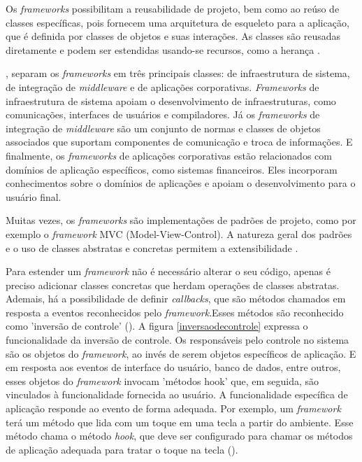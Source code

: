 Os \textit{frameworks} possibilitam a reusabilidade de projeto, bem como ao reúso de classes específicas, pois fornecem uma arquitetura de esqueleto para a aplicação, que é definida por classes de objetos e suas interações. As classes são reusadas diretamente e podem ser estendidas usando-se recursos, como a herança \cite{sommerville:2013}. 

\cite{fayad:1997}, separam os \textit{frameworks} em três principais classes: de infraestrutura de sistema, de integração de \textit{middleware} e de aplicações corporativas. \textit{Frameworks} de infraestrutura de sistema apoiam o desenvolvimento de infraestruturas, como comunicações, interfaces de usuários e compiladores. Já os \textit{frameworks} de integração de \textit{middleware} são um conjunto de normas e classes de objetos associados que suportam componentes de comunicação e troca de informações. E finalmente, os \textit{frameworks} de aplicações corporativas estão relacionados com domínios de aplicação específicos, como sistemas financeiros. Eles incorporam conhecimentos sobre o domínios de aplicações e apoiam o desenvolvimento para o usuário final.

Muitas vezes, os \textit{frameworks} são implementações de padrões de projeto, como por exemplo o \textit{framework} MVC (Model-View-Control). A natureza geral dos padrões e o uso de classes abstratas e concretas permitem a extensibilidade \cite{sommerville:2013}.

Para estender um \textit{framework} não é necessário alterar o seu código, apenas é preciso adicionar classes concretas que herdam operações de classes abstratas. Ademais, há a possibilidade de definir \textit{callbacks}, que são métodos chamados em resposta a eventos reconhecidos pelo \textit{framework}.Esses métodos são reconhecido como 'inversão de controle' (\cite{schmidt:2004}). A figura \ref{inversaodecontrole} expressa o funcionalidade da inversão de controle. Os responsáveis pelo controle no sistema são os objetos do \textit{framework}, ao invés de serem objetos específicos de aplicação. E em resposta aos eventos de interface do usuário, banco de dados, entre outros, esses objetos do \textit{framework} invocam 'métodos hook' que, em seguida, são vinculados à funcionalidade fornecida ao usuário. A funcionalidade específica de aplicação responde ao evento de forma adequada. Por exemplo, um \textit{framework} terá um método que lida com um toque em uma tecla a partir do ambiente. Esse método chama o método \textit{hook}, que deve ser configurado para chamar os métodos de aplicação adequada para tratar o toque na tecla (\cite{sommerville:2013}).

